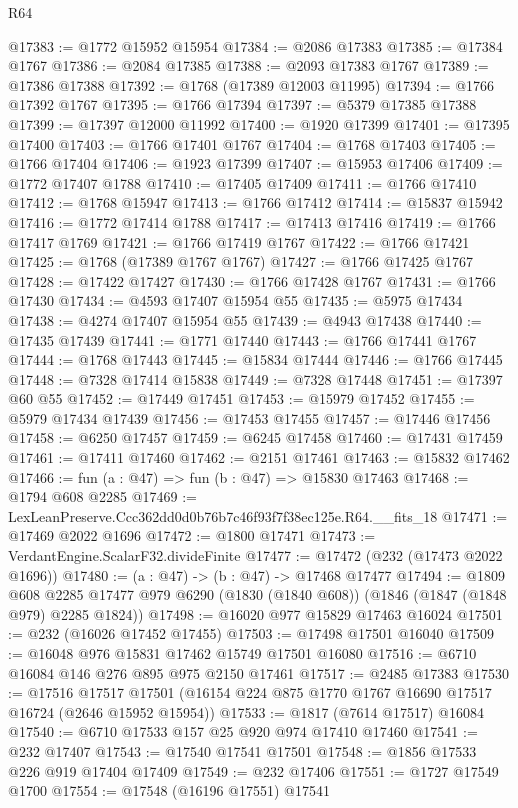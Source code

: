 \begin{lexlean}{R64}
\begin{coremodule}
@17383 := @1772 @15952 @15954
@17384 := @2086 @17383
@17385 := @17384 @1767
@17386 := @2084 @17385
@17388 := @2093 @17383 @1767
@17389 := @17386 @17388
@17392 := @1768 (@17389 @12003 @11995)
@17394 := @1766 @17392 @1767
@17395 := @1766 @17394
@17397 := @5379 @17385 @17388
@17399 := @17397 @12000 @11992
@17400 := @1920 @17399
@17401 := @17395 @17400
@17403 := @1766 @17401 @1767
@17404 := @1768 @17403
@17405 := @1766 @17404
@17406 := @1923 @17399
@17407 := @15953 @17406
@17409 := @1772 @17407 @1788
@17410 := @17405 @17409
@17411 := @1766 @17410
@17412 := @1768 @15947
@17413 := @1766 @17412
@17414 := @15837 @15942
@17416 := @1772 @17414 @1788
@17417 := @17413 @17416
@17419 := @1766 @17417 @1769
@17421 := @1766 @17419 @1767
@17422 := @1766 @17421
@17425 := @1768 (@17389 @1767 @1767)
@17427 := @1766 @17425 @1767
@17428 := @17422 @17427
@17430 := @1766 @17428 @1767
@17431 := @1766 @17430
@17434 := @4593 @17407 @15954 @55
@17435 := @5975 @17434
@17438 := @4274 @17407 @15954 @55
@17439 := @4943 @17438
@17440 := @17435 @17439
@17441 := @1771 @17440
@17443 := @1766 @17441 @1767
@17444 := @1768 @17443
@17445 := @15834 @17444
@17446 := @1766 @17445
@17448 := @7328 @17414 @15838
@17449 := @7328 @17448
@17451 := @17397 @60 @55
@17452 := @17449 @17451
@17453 := @15979 @17452
@17455 := @5979 @17434 @17439
@17456 := @17453 @17455
@17457 := @17446 @17456
@17458 := @6250 @17457
@17459 := @6245 @17458
@17460 := @17431 @17459
@17461 := @17411 @17460
@17462 := @2151 @17461
@17463 := @15832 @17462
@17466 := fun (a : @47) => fun (b : @47) => @15830 @17463
@17468 := @1794 @608 @2285
@17469 := LexLeanPreserve.Ccc362dd0d0b76b7c46f93f7f38ec125e.R64.__fits_18
@17471 := @17469 @2022 @1696
@17472 := @1800 @17471
@17473 := VerdantEngine.ScalarF32.divideFinite
@17477 := @17472 (@232 (@17473 @2022 @1696))
@17480 := (a : @47) -> (b : @47) -> @17468 @17477
@17494 := @1809
    @608
    @2285
    @17477
    @979
    @6290
    (@1830 (@1840 @608))
    (@1846 (@1847 (@1848 @979) @2285 @1824))
@17498 := @16020 @977 @15829 @17463 @16024
@17501 := @232 (@16026 @17452 @17455)
@17503 := @17498 @17501 @16040
@17509 := @16048 @976 @15831 @17462 @15749 @17501 @16080
@17516 := @6710 @16084 @146 @276 @895 @975 @2150 @17461
@17517 := @2485 @17383
@17530 := @17516
    @17517
    @17501
    (@16154 @224 @875 @1770 @1767 @16690 @17517 @16724 (@2646 @15952 @15954))
@17533 := @1817 (@7614 @17517) @16084
@17540 := @6710 @17533 @157 @25 @920 @974 @17410 @17460
@17541 := @232 @17407
@17543 := @17540 @17541 @17501
@17548 := @1856 @17533 @226 @919 @17404 @17409
@17549 := @232 @17406
@17551 := @1727 @17549 @1700
@17554 := @17548 (@16196 @17551) @17541

\end{coremodule}
\end{lexlean}
